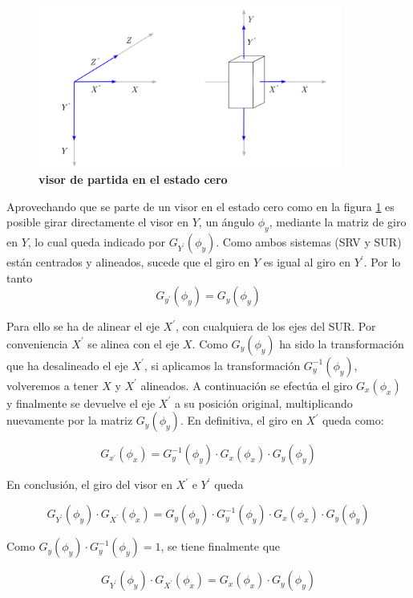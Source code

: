 \begin{figure}[h]
\includegraphics[width=10cm]{Img/GEO/geo-visor-9.png}
\centering
    \caption{\footnotesize{\textbf{visor de partida en el estado cero}}}
    \label{geo-visor9}
\end{figure}

Aprovechando que se parte de un visor en el estado cero como en la figura \ref{geo-visor9} es posible girar directamente el visor en $Y$, un ángulo ${\phi}_y$, mediante la matriz de giro en $Y$, lo cual queda indicado por $G_{Y^{\prime}}({\phi}_y)$. Como ambos sistemas (SRV y SUR) están centrados y alineados, sucede que el giro en $Y$ es igual al giro en $Y^{\prime}$. Por lo tanto
$$G_{y^{\prime}}({\phi}_y) = G_{y}({\phi}_y) $$

Para ello se ha de alinear el eje $X^{\prime}$, con cualquiera de los ejes del SUR. Por conveniencia $X^{\prime}$ se alinea con el eje $X$. Como $G_{y}({\phi}_y)$ ha sido la transformación que ha desalineado el eje $X^{\prime}$, si aplicamos la transformación
${G_{y}^{-1}}({\phi}_y)$, volveremos a tener $X$ y $X^{\prime}$ alineados. A continuación se efectúa el giro $G_{x}({\phi}_x)$ y finalmente se devuelve el eje $X^{\prime}$ a su posición original, multiplicando nuevamente por la matriz ${G_{y}}({\phi}_y)$. En definitiva, el giro en $X^{\prime}$ queda como:

$$G_{x^{\prime}}({\phi}_x) = {G_{y}^{-1}}({\phi}_y) \cdot G_{x}({\phi}_x) \cdot G_{y}({\phi}_y)$$

En conclusión, el giro del visor en $X^{\prime}$ e $Y^{\prime}$ queda 

$$G_{Y^{\prime}}({\phi}_y) \cdot G_{X^{\prime}}({\phi}_x) = G_{y}({\phi}_y) \cdot {G_{y}^{-1}}({\phi}_y) \cdot G_{x}({\phi}_x) \cdot G_{y}({\phi}_y)$$

Como $G_{y}({\phi}_y) \cdot {G_{y}^{-1}}({\phi}_y) = 1$, se tiene finalmente que

$$G_{Y^{\prime}}({\phi}_y) \cdot G_{X^{\prime}}({\phi}_x) =  G_{x}({\phi}_x) \cdot G_{y}({\phi}_y)$$


